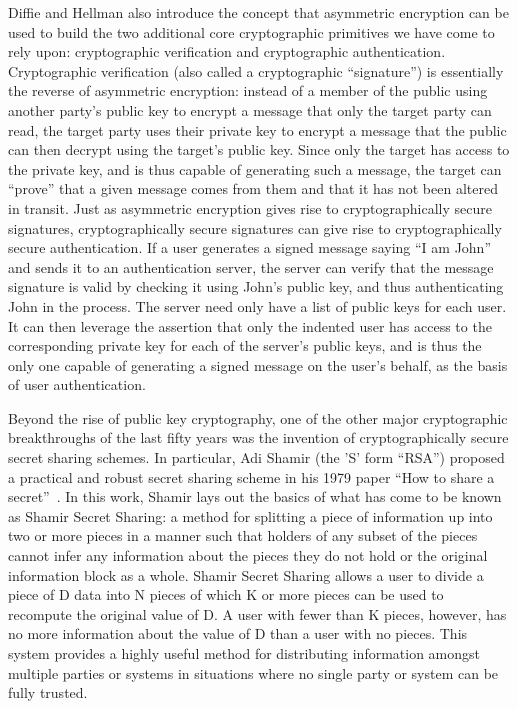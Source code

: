 \documentclass{sig-alternate}
\begin{document}
Diffie and Hellman also introduce the concept that asymmetric
encryption can be used to build the two additional core cryptographic
primitives we have come to rely upon: cryptographic verification and
cryptographic authentication. Cryptographic verification (also called
a cryptographic ``signature'') is essentially the reverse of
asymmetric encryption: instead of a member of the public using another
party's public key to encrypt a message that only the target party can
read, the target party uses their private key to encrypt a message
that the public can then decrypt using the target's public key. Since
only the target has access to the private key, and is thus capable of
generating such a message, the target can ``prove'' that a given
message comes from them and that it has not been altered in
transit. Just as asymmetric encryption gives rise to cryptographically
secure signatures, cryptographically secure signatures can give rise
to cryptographically secure authentication. If a user generates a
signed message saying ``I am John'' and sends it to an authentication
server, the server can verify that the message signature is valid by
checking it using John's public key, and thus authenticating John in
the process. The server need only have a list of public keys for each
user. It can then leverage the assertion that only the indented user
has access to the corresponding private key for each of the server's
public keys, and is thus the only one capable of generating a signed
message on the user's behalf, as the basis of user authentication.

Beyond the rise of public key cryptography, one of the other major
cryptographic breakthroughs of the last fifty years was the invention
of cryptographically secure secret sharing schemes. In particular, Adi
Shamir (the 'S' form ``RSA'') proposed a practical and robust secret
sharing scheme in his 1979 paper ``How to share a
secret''~\cite{Shamir1979}. In this work, Shamir lays out the basics
of what has come to be known as Shamir Secret Sharing: a method for
splitting a piece of information up into two or more pieces in a
manner such that holders of any subset of the pieces cannot infer any
information about the pieces they do not hold or the original
information block as a whole. Shamir Secret Sharing allows a user to
divide a piece of D data into N pieces of which K or more pieces can
be used to recompute the original value of D. A user with fewer than K
pieces, however, has no more information about the value of D than a
user with no pieces. This system provides a highly useful method for
distributing information amongst multiple parties or systems in
situations where no single party or system can be fully trusted.
\end{document}
